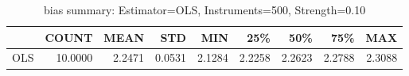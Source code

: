 \begin{table}[ht]
\centering
\caption{bias summary: Estimator=OLS, Instruments=500, Strength=0.10}
\begin{tabular}{lrrrrrrrr}
\toprule
 & COUNT & MEAN & STD & MIN & 25\% & 50\% & 75\% & MAX \\
\midrule
OLS & 10.0000 & 2.2471 & 0.0531 & 2.1284 & 2.2258 & 2.2623 & 2.2788 & 2.3088 \\
\bottomrule
\end{tabular}
\end{table}
